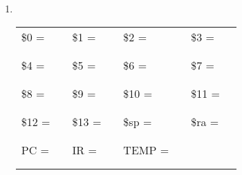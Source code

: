 \documentclass[a4paper,10pt]{article}
\begin{document}
\begin{enumerate}
\begin{enumerate}
\item~
\begin{center}
\begin{tabular}{|lp{1.5cm}|lp{1.5cm}|lp{1.5cm}|lp{1.5cm}|}
\hline
\$0 = & & \$1 = & & \$2 = & & \$3 = &  \\
& & & & & & & \\
& & & & & & & \\
\hline
\$4 = & & \$5 = & & \$6 = & & \$7 = & \\
& & & & & & & \\
& & & & & & & \\
\hline
\$8 = & & \$9 = & & \$10 = & & \$11 = & \\
& & & & & & & \\
& & & & & & & \\
\hline
\$12 = & & \$13 = & & \$sp = & & \$ra = & \\
& & & & & & & \\
& & & & & & & \\
\hline
PC = & & IR = & & TEMP = & &  & \\
& & & & & & & \\
& & & & & & & \\
\hline
\end{tabular}
\end{center}

\end{enumerate}

\end{enumerate}
\end{document}
